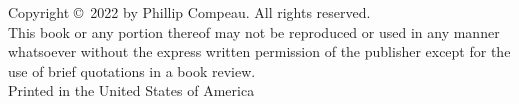 \clearpage\null
\thispagestyle{empty}
\addtocounter{page}{-1}

\newpage


\thispagestyle{empty}


\phantom{}\vspace{17\baselineskip}

\noindent Copyright ©~2022 by Phillip Compeau. All rights reserved.\\

\noindent This book or any portion thereof may not be reproduced or used in any manner whatsoever without the express written permission of the publisher except for the use of brief quotations in a book review.\\

\noindent Printed in the United States of America\\

